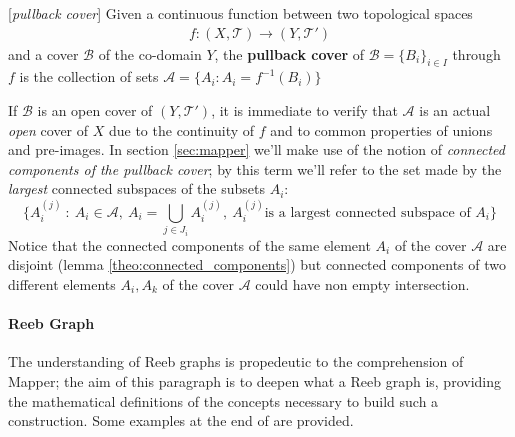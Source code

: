\begin{definition}{[\textit{pullback cover}]}
	Given a continuous function between two topological spaces
	\begin{align*}
	f : (X,\mathcal{T})\rightarrow (Y,\mathcal{T}')
	\end{align*}
	and a cover $\mathcal{B}$ of the co-domain $Y$, the \textbf{pullback cover} of  $\mathcal{B}=\{B_i\}_{i\in I}$ through $f$ is the collection of sets $ \mathcal{A} = \{A_i: A_i=f^{-1}(B_i)\}$
\end{definition}
If $\mathcal{B}$ is an open cover of $(Y,\mathcal{T}')$, it is immediate to verify that $\mathcal{A}$ is an actual \textit{open} cover of $X$ due to the continuity of $f$ and to common properties of unions and pre-images.\newline
In section \ref{sec:mapper} we'll make use of the notion of \textit{connected components of the pullback cover}; by this term we'll refer to the set made by the \textit{largest} connected subspaces of the subsets $A_i$:  $$\{  A_i^{(j)}\ :\ A_i \in \mathcal{A},\ A_i=\bigcup_{j \in J_i} A_i^{(j)},\ A_i^{(j)} \text{is a largest connected subspace of }A_i \}$$ Notice that the connected components of the same element $A_i$ of the cover $\mathcal{A}$ are disjoint (lemma \ref{theo:connected_components}) but connected components of two different elements $A_i, A_k$ of the cover $\mathcal{A}$ could have non empty intersection.

\paragraph{Reeb Graph}
The understanding of Reeb graphs is propedeutic to the comprehension of Mapper; the aim of this paragraph is to deepen what a Reeb graph is, providing the mathematical definitions of the concepts necessary to build such a construction. Some examples at the end of are provided. 

